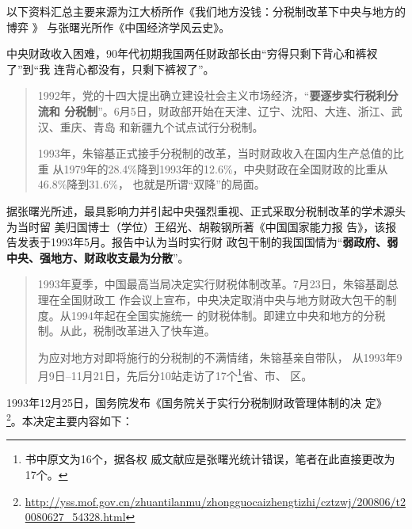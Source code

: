 以下资料汇总主要来源为江大桥所作《我们地方没钱：分税制改革下中央与地方的博弈 》
\cite{difangmeiqian}与张曙光所作《中国经济学风云史》。

中央财政收入困难，90年代初期我国两任财政部长由“穷得只剩下背心和裤衩了”到“我
连背心都没有，只剩下裤衩了”。

\begin{quotation}
  1992年，党的十四大提出确立建设社会主义市场经济，“\textbf{要逐步实行税利分流和
    分税制}”。6月5日，财政部开始在天津、辽宁、沈阳、大连、浙江、武汉、重庆、青岛
  和新疆九个试点试行分税制。

  1993年，朱镕基正式接手分税制的改革，当时财政收入在国内生产总值的比重
  从1979年的28.4\%降到1993年的12.6\%，中央财政在全国财政的比重从46.8\%降到31.6\%，
  也就是所谓“双降”的局面。
\end{quotation}

据张曙光所述，最具影响力并引起中央强烈重视、正式采取分税制改革的学术源头为当时留
美归国博士（学位）王绍光、胡鞍钢所著《中国国家能力报
告》，该报告发表于1993年5月。报告中认为当时实行财
政包干制的我国国情为“\textbf{弱政府、弱中央、强地方、财政收支最为分散}”。

\begin{quotation}
  1993年夏季，中国最高当局决定实行财税体制改革。7月23日，朱镕基副总理在全国财政工
  作会议上宣布，中央决定取消中央与地方财政大包干的制度。从1994年起在全国实施统一
  的财税体制。即建立中央和地方的分税制。从此，税制改革进入了快车道。

  为应对地方对即将施行的分税制的不满情绪，朱镕基亲自带队，
  从1993年9月9日--11月21日，先后分10站走访了17个\footnote{书中原文为16个，据各权
    威文献应是张曙光统计错误，笔者在此直接更改为17个。}省、市、
  区。
\end{quotation}

1993年12月25日，国务院发布《国务院关于实行分税制财政管理体制的决
定》
\footnote{\url{http://yss.mof.gov.cn/zhuantilanmu/zhongguocaizhengtizhi/cztzwj/200806/t20080627_54328.html}}。本决定主要内容如下：

